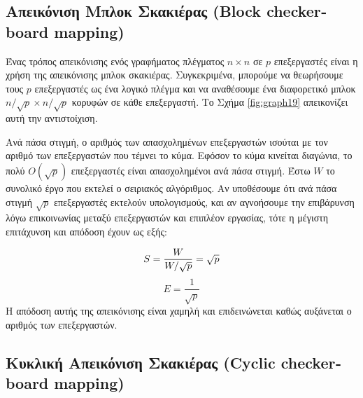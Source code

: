 \documentclass[12pt,a4paper]{article}
\begin{document}
\subsection*{Απεικόνιση Μπλοκ Σκακιέρας (\foreignlanguage{english}{Block checkerboard mapping})}
Ένας τρόπος απεικόνισης
ενός γραφήματος πλέγματος $n \times n$ σε $p$ επεξεργαστές είναι η χρήση
της απεικόνισης μπλοκ σκακιέρας. Συγκεκριμένα,
μπορούμε να θεωρήσουμε τους $p$ επεξεργαστές ως ένα λογικό πλέγμα και
να αναθέσουμε ένα διαφορετικό μπλοκ $n/\sqrt{p} \times n/\sqrt{p}$
κορυφών σε κάθε επεξεργαστή. Το Σχήμα \ref{fig:graph19} απεικονίζει αυτή την
αντιστοίχιση.

Ανά πάσα στιγμή, ο αριθμός των απασχολημένων επεξεργαστών ισούται με
τον αριθμό των επεξεργαστών που τέμνει το κύμα. Εφόσον το κύμα
κινείται διαγώνια, το πολύ $O(\sqrt{p})$ επεξεργαστές είναι
απασχολημένοι ανά πάσα στιγμή. Έστω $W$ το συνολικό έργο που εκτελεί
ο σειριακός αλγόριθμος. Αν υποθέσουμε ότι ανά πάσα στιγμή $\sqrt{p}$
επεξεργαστές εκτελούν υπολογισμούς, και αν αγνοήσουμε την επιβάρυνση
λόγω επικοινωνίας μεταξύ επεξεργαστών και επιπλέον εργασίας, τότε η
μέγιστη επιτάχυνση και απόδοση έχουν ως εξής:

\[
S = \frac{W}{W/\sqrt{p}} = \sqrt{p} \\[6pt]
\]
\[
E = \frac{1}{\sqrt{p}}
\]
Η απόδοση αυτής της απεικόνισης είναι χαμηλή και επιδεινώνεται
καθώς αυξάνεται ο αριθμός των επεξεργαστών.
\subsection*{Κυκλική Απεικόνιση Σκακιέρας (\foreignlanguage{english}{Cyclic checkerboard mapping})} 
\end{document}
